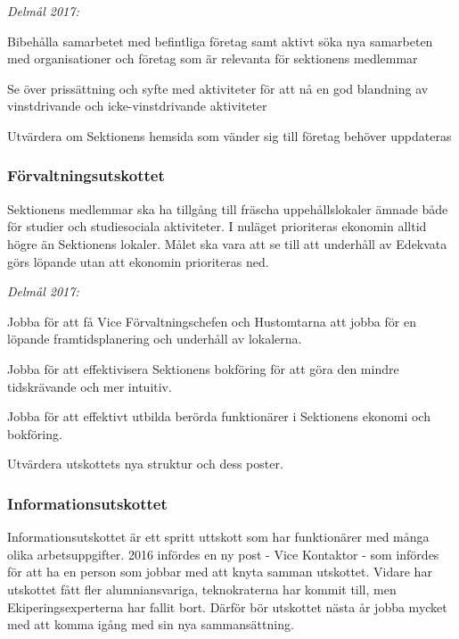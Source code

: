 \documentclass[10pt]{article}
\begin{document}
\emph{Delmål 2017:}
\begin{dashlist}
    \item Bibehålla samarbetet med befintliga företag samt aktivt söka nya samarbeten med organisationer och företag som är relevanta för sektionens medlemmar
    \item Se över prissättning och syfte med aktiviteter för att nå en god blandning av vinstdrivande och icke-vinstdrivande aktiviteter
    \item Utvärdera om Sektionens hemsida som vänder sig till företag behöver uppdateras
\end{dashlist}

\subsubsection*{Förvaltningsutskottet}
Sektionens medlemmar ska ha tillgång till fräscha uppehållslokaler ämnade både för studier och studiesociala aktiviteter. I nuläget prioriteras ekonomin alltid högre än Sektionens lokaler. Målet ska vara att se till att underhåll av Edekvata görs löpande utan att ekonomin prioriteras ned.

\emph{Delmål 2017:}
\begin{dashlist}
    \item Jobba för att få Vice Förvaltningschefen och Hustomtarna att jobba för en löpande framtidsplanering och underhåll av lokalerna.
    \item Jobba för att effektivisera Sektionens bokföring för att göra den mindre tidskrävande och mer intuitiv.
    \item Jobba för att effektivt utbilda berörda funktionärer i Sektionens ekonomi och bokföring.
    \item Utvärdera utskottets nya struktur och dess poster.
\end{dashlist}

\newpage

\subsubsection*{Informationsutskottet}
Informationsutskottet är ett spritt uttskott som har funktionärer med många olika arbetsuppgifter. 2016 infördes en ny post - Vice Kontaktor - som infördes för att ha en person som jobbar med att knyta samman utskottet. Vidare har utskottet fått fler alumniansvariga, teknokraterna har kommit till, men Ekiperingsexperterna har fallit bort. Därför bör utskottet nästa år jobba mycket med att komma igång med sin nya sammansättning.
\end{document}
